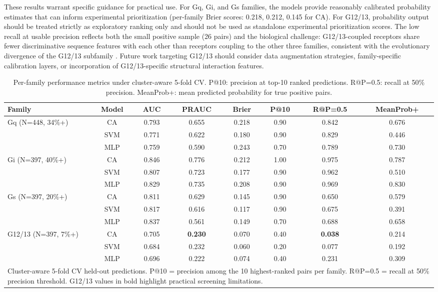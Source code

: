 \documentclass[11pt,a4paper]{article}
\begin{document}
These results warrant specific guidance for practical use. For Gq, Gi, and Gs families, the models provide reasonably calibrated probability estimates that can inform experimental prioritization (per-family Brier scores: 0.218, 0.212, 0.145 for CA). For G12/13, probability output should be treated strictly as exploratory ranking only and should not be used as standalone experimental prioritization scores. The low recall at usable precision reflects both the small positive sample (26 pairs) and the biological challenge: G12/13-coupled receptors share fewer discriminative sequence features with each other than receptors coupling to the other three families, consistent with the evolutionary divergence of the G12/13 subfamily \cite{wettschureck2005mammalian}. Future work targeting G12/13 should consider data augmentation strategies, family-specific calibration layers, or incorporation of G12/13-specific structural interaction features.

\begin{table}[ht]
\centering
\caption{Per-family performance metrics under cluster-aware 5-fold CV. P@10: precision at top-10 ranked predictions. R@P=0.5: recall at 50\% precision. MeanProb+: mean predicted probability for true positive pairs.}
\label{tab:per_family}
\begin{tabular}{lccccccc}
\toprule
Family & Model & AUC & PRAUC & Brier & P@10 & R@P=0.5 & MeanProb+ \\
\midrule
\multirow{3}{*}{Gq (N=448, 34\%+)}
    & CA  & 0.793 & 0.655 & 0.218 & 0.90 & 0.842 & 0.676 \\
    & SVM & 0.771 & 0.622 & 0.180 & 0.90 & 0.829 & 0.446 \\
    & MLP & 0.759 & 0.590 & 0.243 & 0.70 & 0.789 & 0.730 \\
\midrule
\multirow{3}{*}{Gi (N=397, 40\%+)}
    & CA  & 0.846 & 0.776 & 0.212 & 1.00 & 0.975 & 0.787 \\
    & SVM & 0.807 & 0.723 & 0.177 & 0.90 & 0.962 & 0.510 \\
    & MLP & 0.829 & 0.735 & 0.208 & 0.90 & 0.969 & 0.830 \\
\midrule
\multirow{3}{*}{Gs (N=397, 20\%+)}
    & CA  & 0.811 & 0.629 & 0.145 & 0.90 & 0.650 & 0.579 \\
    & SVM & 0.817 & 0.616 & 0.117 & 0.90 & 0.675 & 0.391 \\
    & MLP & 0.837 & 0.561 & 0.149 & 0.70 & 0.688 & 0.658 \\
\midrule
\multirow{3}{*}{G12/13 (N=397, 7\%+)}
    & CA  & 0.705 & \textbf{0.230} & 0.070 & 0.40 & \textbf{0.038} & 0.214 \\
    & SVM & 0.684 & 0.232 & 0.060 & 0.20 & 0.077 & 0.192 \\
    & MLP & 0.696 & 0.222 & 0.074 & 0.40 & 0.231 & 0.309 \\
\bottomrule
\multicolumn{8}{p{0.88\textwidth}}{\small Cluster-aware 5-fold CV held-out predictions. P@10 = precision among the 10 highest-ranked pairs per family. R@P=0.5 = recall at 50\% precision threshold. G12/13 values in bold highlight practical screening limitations.} \\
\end{tabular}
\end{table}
\end{document}
